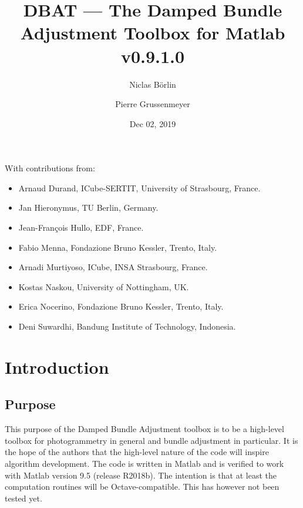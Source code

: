 \documentclass{article}
\begin{document}


\newcommand{\dbatversion}{0.9.1.0}
\newcommand{\dbatdate}{Dec 02, 2019}

\title{DBAT --- The Damped Bundle Adjustment Toolbox for Matlab\\\Large v\dbatversion{}}

\author[1]{Niclas B{\"o}rlin}
\author[2]{Pierre Grussenmeyer}
\date{\dbatdate}

\maketitle

\vfill
With contributions from:
\begin{itemize}
\item Arnaud Durand, ICube-SERTIT, University of Strasbourg, France.
\item Jan Hieronymus, TU Berlin, Germany.
\item Jean-Fran{\c{c}}ois Hullo, EDF, France.
\item Fabio Menna, Fondazione Bruno Kessler, Trento, Italy.
\item Arnadi Murtiyoso, ICube, INSA Strasbourg, France.
\item Kostas Naskou, University of Nottingham, UK.
\item Erica Nocerino, Fondazione Bruno Kessler, Trento, Italy.
\item Deni Suwardhi, Bandung Institute of Technology, Indonesia.
\end{itemize}
\newpage

\tableofcontents

\newpage

\section{Introduction}

\subsection{Purpose}

This purpose of the Damped Bundle Adjustment toolbox is to be a
high-level toolbox for photogrammetry in general and bundle adjustment
in particular. It is the hope of the authors that the high-level
nature of the code will inspire algorithm development. The code is
written in Matlab and is verified to work with Matlab version 9.5
(release R2018b). The intention is that at least the computation
routines will be Octave-compatible. This has however not been tested
yet.
\end{document}
